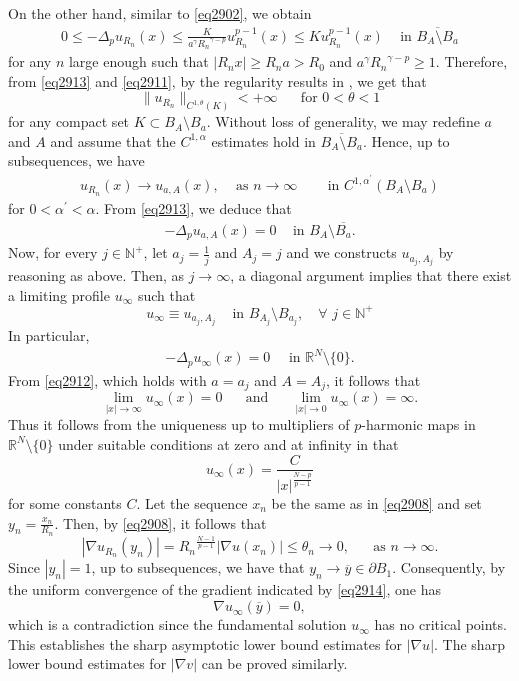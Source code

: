 \documentclass[12pt]{amsart}
\theoremstyle{definition}
\theoremstyle{remark}
\theoremstyle{conclusion}
\theoremstyle{conjecture}
\numberwithin{equation}{section}
\newcommand{\R}{\mathbb{R}}
\newcommand{\N}{\mathbb{N}}
\begin{document}
On the other hand, similar to \eqref{eq2902}, we obtain
\begin{align}\label{eq2913}
0\leq-\Delta_p u_{R_n} (x) \leq \frac{K}{a^{\gamma} {R_n}^{\gamma-p}} u^{p-1}_{R_{n}}(x) \leq K u^{p-1}_{R_n}(x) \,\,\,\,\,\,\,\mbox{in}\,\,\overline{B_A \setminus B_a}
\end{align}
for any $n$ large enough such that $|R_n x|\geq R_{n}a>R_0$ and $a^{\gamma} {R_n}^{\gamma-p}\geq1$. Therefore, from \eqref{eq2913} and \eqref{eq2911}, by the regularity results in \cite{PT}, we get that
$$ \|u_{R_n}\|_{C^{1,\theta} (K)}<+\infty \,\,\,\,\quad \mbox{for}\,\,0<\theta<1$$
for any compact set $K\subset B_A \setminus B_a$. Without loss of generality, we may redefine $a$ and $A$ and assume that the $C^{1,\alpha}$ estimates hold in $\overline{B_A \setminus B_a}$. Hence, up to subsequences, we have
\begin{align}\label{eq2914}
u_{R_n} (x) \to  u_{a,A}(x),\,\quad \mbox{as}\,\,n\to\infty \,\,\,\,\,\quad\,\, \mbox{in}\,\,C^{1,\alpha^\prime}(B_A \setminus B_a)
\end{align}
for $0<\alpha^\prime<\alpha$. From \eqref{eq2913}, we deduce that
\begin{align}\label{eq2915}
-\Delta_p u_{a,A}(x)=0\,\,\,\,\,\,\,\mbox{in}\,\,B_A \setminus \overline{B_a}.
\end{align}
Now, for every $j\in\N^+$, let $a_j=\frac{1}{j}$ and $A_j=j$ and we constructs $u_{a_j,A_j}$ by reasoning as above. Then, as $j\to\infty$, a diagonal argument implies that there exist a limiting profile $u_\infty$ such that
$$ u_\infty \equiv u_{a_j,A_j} \,\,\,\,\,\,\,\mbox{in}\,\, B_{A_j} \setminus B_{a_j}, \quad \forall \,\,j\in\N^+$$
In particular,
\begin{align}\label{eq2916}
-\Delta_p u_\infty (x)=0\,\,\,\,\,\,\,\,\mbox{in}\,\,\R^N \setminus \{ 0 \}.
\end{align}
From \eqref{eq2912}, which holds with $a=a_j$ and $A=A_j$, it follows that
$$ \lim_{|x|\to\infty} u_\infty (x)=0\,\,\,\,\quad\mbox{and}\,\,\,\,\quad\lim_{|x|\to 0} u_\infty (x)= \infty.$$
Thus it follows from the uniqueness up to multipliers of $p$-harmonic maps in $\R^N\setminus \{0\}$ under suitable conditions at zero and at infinity in \cite[Theorem 2.1]{BS16} that
$$ u_\infty (x)= \frac{C}{|x|^\frac{N-p}{p-1}}$$
for some constants $C$.
Let the sequence $x_n$ be the same as in \eqref{eq2908} and set $y_n=\frac{x_n}{R_n}$. Then, by \eqref{eq2908}, it follows that
$$|\nabla u_{R_n}(y_n)| ={R_n}^\frac{N-1}{p-1} |\nabla u(x_n)|  \leq \theta_n \to 0,\quad\,\,\,\,\mbox{as}\,\,n\to\infty.$$
Since $|y_n|=1$, up to subsequences, we have that $y_n\to\overline{y} \in \partial B_1$.
Consequently, by the uniform convergence of the gradient indicated by \eqref{eq2914}, one has
$$ \nabla u_\infty(\overline{y})=0,$$
which is a contradiction since the fundamental solution $u_{\infty}$ has no critical points. This establishes the sharp asymptotic lower bound estimates for $|\nabla u|$. The sharp lower bound estimates for $|\nabla v|$ can be proved similarly.
\end{document}
